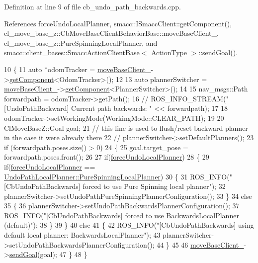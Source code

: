 Definition at line 9 of file cb\+\_\+undo\+\_\+path\+\_\+backwards.\+cpp.



References force\+Undo\+Local\+Planner, smacc\+::\+I\+Smacc\+Client\+::get\+Component(), cl\+\_\+move\+\_\+base\+\_\+z\+::\+Cb\+Move\+Base\+Client\+Behavior\+Base\+::move\+Base\+Client\+\_\+, cl\+\_\+move\+\_\+base\+\_\+z\+::\+Pure\+Spinning\+Local\+Planner, and smacc\+::client\+\_\+bases\+::\+Smacc\+Action\+Client\+Base$<$ Action\+Type $>$\+::send\+Goal().


\begin{DoxyCode}
10 \{
11   \textcolor{keyword}{auto} *odomTracker = \hyperlink{classcl__move__base__z_1_1CbMoveBaseClientBehaviorBase_ab2ef219464cfac8659b4a87c8d0db6d5}{moveBaseClient\_}->\hyperlink{classsmacc_1_1ISmaccClient_adef78db601749ca63c19e74a27cb88cc}{getComponent}<OdomTracker>();
12 
13   \textcolor{keyword}{auto} plannerSwitcher = \hyperlink{classcl__move__base__z_1_1CbMoveBaseClientBehaviorBase_ab2ef219464cfac8659b4a87c8d0db6d5}{moveBaseClient\_}->\hyperlink{classsmacc_1_1ISmaccClient_adef78db601749ca63c19e74a27cb88cc}{getComponent}<PlannerSwitcher>();
14 
15   nav\_msgs::Path forwardpath = odomTracker->getPath();
16   \textcolor{comment}{// ROS\_INFO\_STREAM("[UndoPathBackward] Current path backwards: " << forwardpath);}
17 
18   odomTracker->setWorkingMode(WorkingMode::CLEAR\_PATH);
19 
20   ClMoveBaseZ::Goal goal;
21   \textcolor{comment}{// this line is used to flush/reset backward planner in the case it were already there}
22   \textcolor{comment}{// plannerSwitcher->setDefaultPlanners();}
23   \textcolor{keywordflow}{if} (forwardpath.poses.size() > 0)
24   \{
25     goal.target\_pose = forwardpath.poses.front();
26 
27     \textcolor{keywordflow}{if}(\hyperlink{classcl__move__base__z_1_1CbUndoPathBackwards_a2dfb07d7391147e2fc06e01749bfd5bc}{forceUndoLocalPlanner})
28     \{
29       \textcolor{keywordflow}{if}(\hyperlink{classcl__move__base__z_1_1CbUndoPathBackwards_a2dfb07d7391147e2fc06e01749bfd5bc}{forceUndoLocalPlanner} == 
      \hyperlink{namespacecl__move__base__z_aa8702d7f4bc14a650da006a263801a8ba87a2d2768806d402074aeaca3398b5ff}{UndoPathLocalPlanner::PureSpinningLocalPlanner})
30       \{
31         ROS\_INFO(\textcolor{stringliteral}{"[CbUndoPathBackwards] forced to use Pure Spinning local planner"});
32         plannerSwitcher->setUndoPathPureSpinningPlannerConfiguration();
33       \}
34       \textcolor{keywordflow}{else}
35       \{
36         plannerSwitcher->setUndoPathBackwardsPlannerConfiguration();
37         ROS\_INFO(\textcolor{stringliteral}{"[CbUndoPathBackwards] forced to use BackwardsLocalPlanner (default)"});
38       \}
39     \}
40     \textcolor{keywordflow}{else}
41     \{
42       ROS\_INFO(\textcolor{stringliteral}{"[CbUndoPathBackwards] using default local planner: BackwardsLocalPlanner"});
43       plannerSwitcher->setUndoPathBackwardsPlannerConfiguration();
44     \}
45 
46     \hyperlink{classcl__move__base__z_1_1CbMoveBaseClientBehaviorBase_ab2ef219464cfac8659b4a87c8d0db6d5}{moveBaseClient\_}->\hyperlink{classsmacc_1_1client__bases_1_1SmaccActionClientBase_a9c47a5094ac8afb01680307fe5eca922}{sendGoal}(goal);
47   \}
48 \}
\end{DoxyCode}
